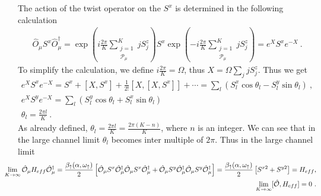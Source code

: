 \documentclass[10pt]{iopart}
\begin{document}
The action of the twist operator on the $S^x$ is determined in the following calculation
\begin{eqnarray}
\hat{O}_{\mu} S^x \hat{O}^{\dagger}_{\mu} = \exp({i\frac{2\pi}{K} \displaystyle\sum_{\substack{j=1\\ \mathcal{P}_{\mu}}}^{K} j S_j^z} )S^x \exp({-i\frac{2\pi}{K} \displaystyle\sum_{\substack{j=1\\ \mathcal{P}_{\mu}}}^{K} j S_j^z} ) = e^{X} S^x e^{-X}~.
\end{eqnarray}
To simplify the calculation, we define $i\frac{2\pi}{K}=\Omega$, thus $X=\Omega\sum_j jS^z_j$. Thus we get
\begin{eqnarray}
e^X S^x e^{-X}= S^x+[X,S^x] + \frac{1}{2!}[X,[X,S^x]] +\cdots = \sum_l ( S^x_l \cos \theta_l -  S_l^y \sin \theta_l ) ~,\nonumber\\
e^X S^y e^{-X}= \sum_l  (S^y_l \cos\theta_l  + S^x_l \sin\theta_l)\nonumber\\
\theta_l=\frac{2\pi l}{K}~.
\end{eqnarray}
As already defined, $\theta_l=\frac{2\pi l}{K}=\frac{2\pi (K-n)}{K}$, where $n$ is an integer. We can see that in the large channel limit $\theta_l $ becomes inter multiple of $2\pi$. Thus in the large channel limit
\begin{eqnarray}
	\hspace*{-20pt}\lim_{K\rightarrow \infty}\hat{\mathcal{O}}_{\mu} H_{eff} \hat{\mathcal{O}}_{\mu}^{\dagger}\nonumber = \frac{\beta_{\uparrow}(\alpha,\omega_{\uparrow})}{2} \left[ \hat{\mathcal{O}}_{\mu} S^x \hat{\mathcal{O}}_{\mu}^{\dagger} \hat{\mathcal{O}}_{\mu} S^x \hat{\mathcal{O}}_{\mu}^{\dagger}  + \hat{\mathcal{O}}_{\mu} S^y \hat{\mathcal{O}}_{\mu}^{\dagger} \hat{\mathcal{O}}_{\mu} S^y \hat{\mathcal{O}}_{\mu}^{\dagger}  \right] = \frac{\beta_{\uparrow}(\alpha,\omega_{\uparrow})}{2} \left[  S^{x2}+S^{y2}  \right] = H_{eff},\\
\hspace*{-20pt} \lim_{K\rightarrow \infty } [\hat{\mathcal{O}},H_{eff}] = 0~.
\label{eq:hamiltonian_twisted}
\end{eqnarray}
 
\end{document}
